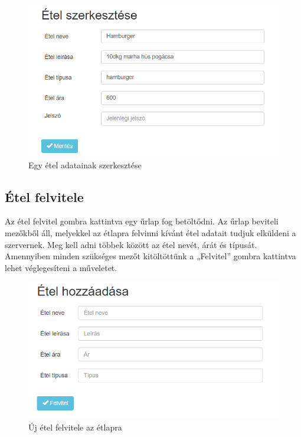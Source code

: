 \begin{figure}
\centering
\includegraphics[scale=0.8]{kepek/edit_meal.png}
\caption{Egy étel adatainak szerkesztése}
\label{fig:edit_meal}
\end{figure}

\subsection{Étel felvitele}

Az étel felvitel gombra kattintva egy űrlap fog betöltődni. Az űrlap beviteli mezőkből áll, melyekkel az étlapra felvinni kívánt étel adatait tudjuk elküldeni a szervernek. Meg kell adni többek között az étel nevét, árát és típusát. Amennyiben minden szükséges mezőt kitöltöttünk a „Felvitel” gombra kattintva lehet véglegesíteni a műveletet.

\begin{figure}
\centering
\includegraphics[scale=0.8]{kepek/add_meal.png}
\caption{Új étel felvitele az étlapra}
\label{fig:add_meal}
\end{figure}

